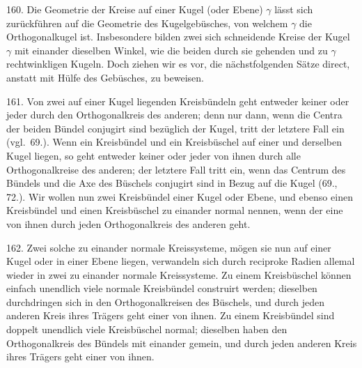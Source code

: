 \hspace{\parindent}%
160. Die Geometrie der Kreise auf einer Kugel (oder
Ebene) $\gamma$ l\"asst sich zur\"uckf\"uhren auf die Geometrie des Kugelgeb\"usches,
von welchem $\gamma$ die Orthogonalkugel ist. Insbesondere
bilden zwei sich schneidende Kreise der Kugel $\gamma$
mit einander dieselben Winkel, wie die beiden durch sie
gehenden und zu $\gamma$ rechtwinkligen Kugeln. Doch ziehen wir
es vor, die n\"achstfolgenden S\"atze direct, anstatt mit H\"ulfe
des Geb\"usches, zu beweisen.

161. Von zwei auf einer Kugel liegenden Kreisb\"undeln
geht entweder keiner oder jeder durch den Orthogonalkreis
des anderen; denn nur dann, wenn die Centra der beiden
B\"undel conjugirt sind bez\"uglich der Kugel, tritt der letztere
Fall ein (vgl.~69.). Wenn ein Kreisb\"undel und ein Kreisb\"uschel
auf einer und derselben Kugel liegen, so geht entweder
keiner oder jeder von ihnen durch alle Orthogonalkreise
des anderen; der letztere Fall tritt ein, wenn das Centrum
des B\"undels und die Axe des B\"uschels conjugirt sind
in Bezug auf die Kugel (69., 72.). Wir wollen nun zwei Kreisb\"undel
einer Kugel oder Ebene, und ebenso einen Kreisb\"undel
und einen Kreisb\"uschel {\glqq}zu einander normal{\grqq} nennen, wenn der
eine von ihnen durch jeden Orthogonalkreis des anderen geht.

162. Zwei solche zu einander normale Kreissysteme,
m\"ogen sie nun auf einer Kugel oder in einer Ebene liegen,
verwandeln sich durch reciproke Radien allemal wieder in
zwei zu einander normale Kreissysteme. Zu einem Kreisb\"uschel
k\"onnen einfach unendlich viele normale Kreisb\"undel construirt
werden; dieselben durchdringen sich in den Orthogonalkreisen
des B\"uschels, und durch jeden anderen Kreis ihres Tr\"agers
geht einer von ihnen. Zu einem Kreisb\"undel sind doppelt
unendlich viele Kreisb\"uschel normal; dieselben haben den
Orthogonalkreis des B\"undels mit einander gemein, und durch
jeden anderen Kreis ihres Tr\"agers geht einer von ihnen.

